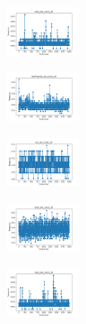 \begin{figure}[H]
    \begin{subfigure}
        \centering
        \includegraphics[width=0.234\textwidth]{img/aggun/rand_set_const_20_277451237_time.png}
    \end{subfigure}
    \hfill
    \begin{subfigure}
        \centering
        \includegraphics[width=0.234\textwidth]{img/aggun/newthyroid_set_const_20_277451237_time.png}
    \end{subfigure}
    \hfill
    \begin{subfigure}
        \centering
        \includegraphics[width=0.234\textwidth]{img/aggun/iris_set_const_20_49258669_time.png}
    \end{subfigure}
    \hfill
    \begin{subfigure}
        \centering
        \includegraphics[width=0.234\textwidth]{img/aggun/ecoli_set_const_20_49258669_time.png}
    \end{subfigure}
    \hfill
    \begin{subfigure}
        \centering
        \includegraphics[width=0.234\textwidth]{img/aggun/rand_set_const_20_49258669_time.png}
    \end{subfigure}
    \hfill
    \begin{subfigure}
        \centering

\end{subfigure}
\end{figure}
